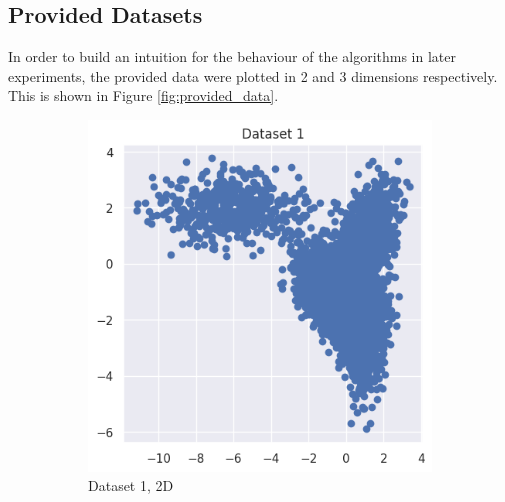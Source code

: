 \documentclass[12pt]{article}
\begin{document}
\subsection{Provided Datasets}

In order to build an intuition for the behaviour of the algorithms in later
experiments, the provided data were plotted in 2 and 3 dimensions respectively.
This is shown in Figure \ref{fig:provided_data}.

\begin{figure}[ht]
    \centering
    \begin{subfigure}{0.3\textwidth}
      \centering
      \includegraphics[width=\linewidth]{0.png}
      \caption{Dataset 1, 2D}
      \label{fig:provided_data_1}
    \end{subfigure}%
    \hfill
    \begin{subfigure}{0.3\textwidth}
      \centering

\end{subfigure}
\end{figure}
\end{document}
